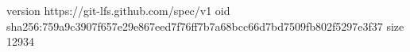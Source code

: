version https://git-lfs.github.com/spec/v1
oid sha256:759a9c3907f657e29e867eed7f76ff7b7a68bcc66d7bd7509fb802f5297e3f37
size 12934
